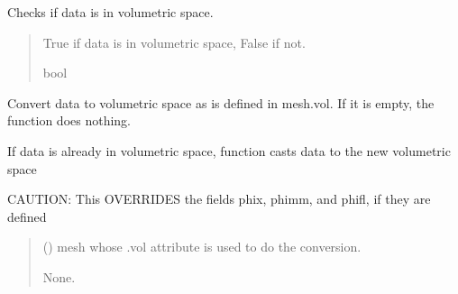\documentclass[letterpaper,10pt,english]{sphinxmanual}
\begin{document}
\begin{fulllineitems}
\begin{fulllineitems}
\label{\detokenize{_autosummary/nirfasterff.base.data.FLdata:nirfasterff.base.data.FLdata.isvol}}
\pysigstartsignatures
\pysiglinewithargsret
{}
{}
{}
\pysigstopsignatures
\sphinxAtStartPar
Checks if data is in volumetric space.
\begin{quote}\begin{description}
\sphinxAtStartPar
True if data is in volumetric space, False if not.

\sphinxAtStartPar
bool

\end{description}\end{quote}

\end{fulllineitems}


\begin{fulllineitems}
\label{\detokenize{_autosummary/nirfasterff.base.data.FLdata:nirfasterff.base.data.FLdata.togrid}}
\pysigstartsignatures
\pysiglinewithargsret
{}
{}
{}
\pysigstopsignatures
\sphinxAtStartPar
Convert data to volumetric space as is defined in mesh.vol. If it is empty, the function does nothing.

\sphinxAtStartPar
If data is already in volumetric space, function casts data to the new volumetric space

\sphinxAtStartPar
CAUTION: This OVERRIDES the fields phix, phimm, and phifl, if they are defined
\begin{quote}\begin{description}
\sphinxAtStartPar
{} () \textendash{} mesh whose .vol attribute is used to do the conversion.

\sphinxAtStartPar
None.

\end{description}\end{quote}

\end{fulllineitems}



\end{fulllineitems}
\end{document}
